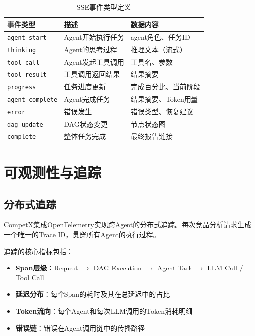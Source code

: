 \documentclass[12pt,a4paper]{ctexrep}
\begin{document}
\begin{table}[H]
\centering
\caption{SSE事件类型定义}
\label{tab:sse-events}
{\small
\begin{tabular}{p{3.5cm} p{5cm} p{4.5cm}}
\toprule
\textbf{事件类型} & \textbf{描述} & \textbf{数据内容} \\
\midrule
\texttt{agent\_start} & Agent开始执行任务 & agent角色、任务ID \\
\texttt{thinking} & Agent的思考过程 & 推理文本（流式） \\
\texttt{tool\_call} & Agent发起工具调用 & 工具名、参数 \\
\texttt{tool\_result} & 工具调用返回结果 & 结果摘要 \\
\texttt{progress} & 任务进度更新 & 完成百分比、当前阶段 \\
\texttt{agent\_complete} & Agent完成任务 & 结果摘要、Token用量 \\
\texttt{error} & 错误发生 & 错误类型、恢复建议 \\
\texttt{dag\_update} & DAG状态变更 & 节点状态图 \\
\texttt{complete} & 整体任务完成 & 最终报告链接 \\
\bottomrule
\end{tabular}
}
\end{table}

\section{可观测性与追踪}

\subsection{分布式追踪}

CompetX集成OpenTelemetry\cite{opentelemetry2024}实现跨Agent的分布式追踪。每次竞品分析请求生成一个唯一的Trace ID，贯穿所有Agent的执行过程。

追踪的核心指标包括：

\begin{itemize}[leftmargin=2em]
\item \textbf{Span层级}：Request $\rightarrow$ DAG Execution $\rightarrow$ Agent Task $\rightarrow$ LLM Call / Tool Call
\item \textbf{延迟分布}：每个Span的耗时及其在总延迟中的占比
\item \textbf{Token流向}：每个Agent和每次LLM调用的Token消耗明细
\item \textbf{错误链}：错误在Agent调用链中的传播路径
\end{itemize}
\end{document}
